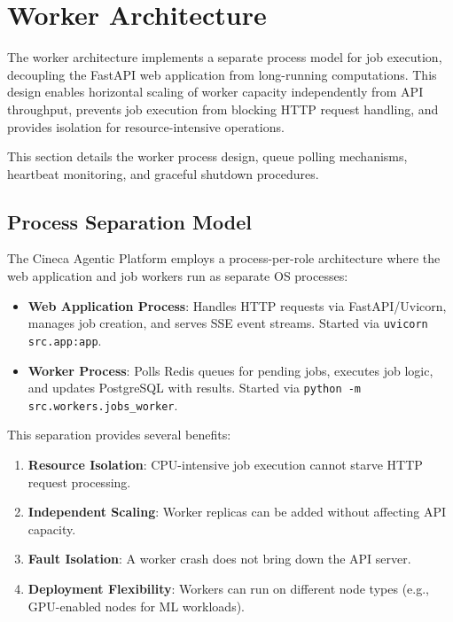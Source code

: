 
\section{Worker Architecture}
\label{sec:worker-arch}

The worker architecture implements a separate process model for job execution, decoupling the FastAPI web application from long-running computations. This design enables horizontal scaling of worker capacity independently from API throughput, prevents job execution from blocking HTTP request handling, and provides isolation for resource-intensive operations.

This section details the worker process design, queue polling mechanisms, heartbeat monitoring, and graceful shutdown procedures.

\subsection{Process Separation Model}

The Cineca Agentic Platform employs a process-per-role architecture where the web application and job workers run as separate OS processes:

\begin{itemize}
    \item \textbf{Web Application Process}: Handles HTTP requests via FastAPI/Uvicorn, manages job creation, and serves SSE event streams. Started via \texttt{uvicorn src.app:app}.
    
    \item \textbf{Worker Process}: Polls Redis queues for pending jobs, executes job logic, and updates PostgreSQL with results. Started via \texttt{python -m src.workers.jobs\_worker}.
\end{itemize}

This separation provides several benefits:

\begin{enumerate}
    \item \textbf{Resource Isolation}: CPU-intensive job execution cannot starve HTTP request processing.
    
    \item \textbf{Independent Scaling}: Worker replicas can be added without affecting API capacity.
    
    \item \textbf{Fault Isolation}: A worker crash does not bring down the API server.
    
    \item \textbf{Deployment Flexibility}: Workers can run on different node types (e.g., GPU-enabled nodes for ML workloads).
\end{enumerate}

